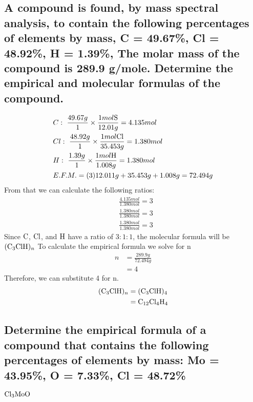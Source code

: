 \documentclass[11pt]{article}
\begin{document}
\subsection{A compound is found, by mass spectral analysis, to contain the following percentages of elements by mass, C = 49.67\%, Cl = 48.92\%, H = 1.39\%, The molar mass of the compound is 289.9 g/mole. Determine the empirical and molecular formulas of the compound.}
\label{sec:orgad3d968}
\begin{align*}
&C:\ \frac{49.67g}{1}\times\frac{1mol\ce{S}}{12.01g}=4.135mol\\
&Cl:\ \frac{48.92g}{1}\times\frac{1mol\ce{Cl}}{35.453g}=1.380mol\\
&H:\ \frac{1.39g}{1}\times\frac{1mol\ce{H}}{1.008g}=1.380mol\\
&E.F.M.=(3)12.011g+35.453g+1.008g=72.494g
\end{align*}
From that we can calculate the following ratios:
\begin{align*}
&\frac{4.135mol}{1.380mol}=3\\
&\frac{1.380mol}{1.380mol}=3\\
&\frac{1.380mol}{1.380mol}=3
\end{align*}
Since \(\ce{C}\), \(\ce{Cl}\), and  \(\ce{H}\) have a ratio of \(3:1:1\), the molecular formula will be \(\ce{(C3ClH)_n}\) To calculate the empirical formula we solve for n
\begin{align*}
n&=\frac{289.9g}{72.494g}\\
&=4
\end{align*}
Therefore, we can substitute 4 for n.
\begin{align*}
\ce{(C3ClH)_n}&=\ce{(C3ClH)4}\\
&=\ce{C12Cl4H4}
\end{align*}

\subsection{Determine the empirical formula of a compound that contains the following percentages of elements by mass: Mo = 43.95\%, O = 7.33\%, Cl = 48.72\%}
\label{sec:orgb3fd19c}
\(\ce{Cl3MoO}\)
\end{document}
